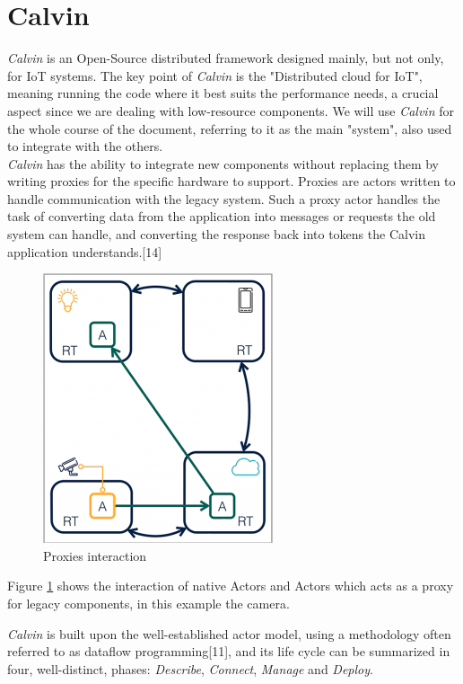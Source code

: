 \section{Calvin}
  \textit{Calvin} is an Open-Source distributed framework designed mainly, but not only,
  for IoT systems. The key point of \textit{Calvin} is the "Distributed cloud for IoT", meaning
  running the code where it best suits the performance needs, a crucial aspect since we are
  dealing with low-resource components. We will use \textit{Calvin} for the whole course of the document,
  referring to it as the main "system", also used to integrate with the others. \\
  \textit{Calvin} has the ability to integrate new components without replacing them by writing
  proxies for the specific hardware to support. Proxies are actors written to handle
  communication with the legacy system. Such a proxy actor handles the task of converting data
  from the application into messages or requests the old system can handle, and converting the
  response back into tokens the Calvin application understands.[14]

        \begin{figure}[h]
        \caption{Proxies interaction}
        \label{fig:calvinproxy}
        \centering
        \includegraphics[scale=0.75]{calvin4.png}
        \end{figure}
  Figure \ref{fig:calvinproxy} shows the interaction of native Actors and Actors which
  acts as a proxy for legacy components, in this example the camera.




  \textit{Calvin} is built upon the well-established actor model, using a methodology often referred to as dataflow programming[11], and
  its life cycle can be summarized in four, well-distinct, phases: \textit{Describe}, \textit{Connect}, \textit{Manage}
  and \textit{Deploy}.

